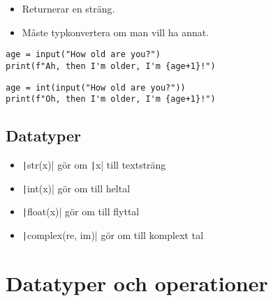 \begin{frame}
  \begin{remark}
    \begin{itemize}
      \item Returnerar en sträng.
      \item Måste typkonvertera om man vill ha annat.
    \end{itemize}
  \end{remark}
\end{frame}

\begin{frame}[fragile]
  \begin{example}
    \begin{verbatim}
age = input("How old are you?")
print(f"Ah, then I'm older, I'm {age+1}!")
    \end{verbatim}
  \end{example}

  \pause

  \begin{example}[Funkar]
    \begin{verbatim}
age = int(input("How old are you?"))
print(f"Oh, then I'm older, I'm {age+1}!")
    \end{verbatim}
  \end{example}
\end{frame}

\subsection{Datatyper}

\begin{frame}
  \begin{remark}
    \begin{itemize}
      \item \texttt|str(x)| gör om \texttt|x| till textsträng
      \item \texttt|int(x)| gör om till heltal
      \item \texttt|float(x)| gör om till flyttal
      \item \texttt|complex(re, im)| gör om till komplext tal
    \end{itemize}
  \end{remark}
\end{frame}


\section{Datatyper och operationer}

